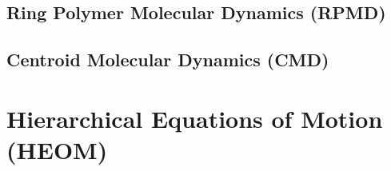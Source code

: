 \documentclass[9pt]{report}
\begin{document}
\subsection{Ring Polymer Molecular Dynamics (RPMD)}

\subsection{Centroid Molecular Dynamics (CMD)}













\newpage
\section{Hierarchical Equations of Motion (HEOM)}
\end{document}
